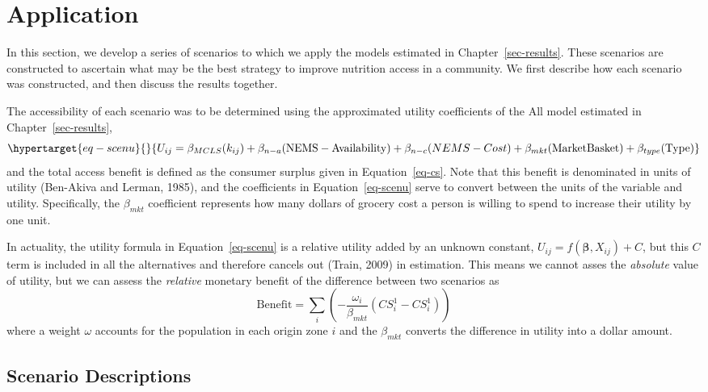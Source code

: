 \documentclass[
  letterpaper,
  DIV=11,
  numbers=noendperiod]{scrreport}
\begin{document}

\hypertarget{sec-scenarios}{%
\chapter{Application}\label{sec-scenarios}}

In this section, we develop a series of scenarios to which we apply the
models estimated in Chapter~\ref{sec-results}. These scenarios are
constructed to ascertain what may be the best strategy to improve
nutrition access in a community. We first describe how each scenario was
constructed, and then discuss the results together.

The accessibility of each scenario was to be determined using the
approximated utility coefficients of the All model estimated in
Chapter~\ref{sec-results},
\begin{equation}\protect\hypertarget{eq-scenu}{}{
U_{ij}= \beta_{MCLS}( k_{ij}) +  \beta_{n-a} (\mathrm{NEMS-Availability}) + \beta_{n-c}\mathrm({NEMS-Cost}) +
 \beta_{mkt} (\mathrm{Market Basket}) + \mathbf{\beta}_{type}(\mathrm{Type}) 
}\label{eq-scenu}\end{equation} and the total access benefit is defined
as the consumer surplus given in Equation~\ref{eq-cs}. Note that this
benefit is denominated in units of utility (Ben-Akiva and Lerman, 1985),
and the coefficients in Equation~\ref{eq-scenu} serve to convert between
the units of the variable and utility. Specifically, the \(\beta_{mkt}\)
coefficient represents how many dollars of grocery cost a person is
willing to spend to increase their utility by one unit.

In actuality, the utility formula in Equation~\ref{eq-scenu} is a
relative utility added by an unknown constant,
\(U_{ij} = f(\mathbf{\beta}, X_{ij}) + C\), but this \(C\) term is
included in all the alternatives and therefore cancels out (Train, 2009)
in estimation. This means we cannot asses the \emph{absolute} value of
utility, but we can assess the \emph{relative} monetary benefit of the
difference between two scenarios as \[
\mathrm{Benefit} = \sum_{i}\left(-\frac{\omega_i}{\beta_{mkt}}(CS_i^1 - CS_i^1)\right)
\] where a weight \(\omega\) accounts for the population in each origin
zone \(i\) and the \(\beta_{mkt}\) converts the difference in utility
into a dollar amount.

\hypertarget{scenario-descriptions}{%
\section{Scenario Descriptions}\label{scenario-descriptions}}
\end{document}
